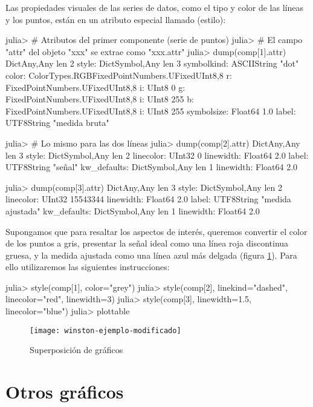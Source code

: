 Las propiedades visuales de las series de datos, como el tipo y color de las líneas y los puntos, están en un atributo especial llamado  (estilo):

\begin{jlconcode}
julia> # Atributos del primer componente (serie de puntos)
julia> # El campo "attr" del objeto "xxx" se extrae como "xxx.attr"
julia> dump(comp[1].attr)
Dict{Any,Any} len 2
  style: Dict{Symbol,Any} len 3
    symbolkind: ASCIIString "dot"
    color: ColorTypes.RGB{FixedPointNumbers.UFixed{UInt8,8}} 
      r: FixedPointNumbers.UFixed{UInt8,8} 
        i: UInt8 0
      g: FixedPointNumbers.UFixed{UInt8,8} 
        i: UInt8 255
      b: FixedPointNumbers.UFixed{UInt8,8} 
        i: UInt8 255
    symbolsize: Float64 1.0
  label: UTF8String "medida bruta"

julia> # Lo mismo para las dos líneas
julia> dump(comp[2].attr)
Dict{Any,Any} len 3
  style: Dict{Symbol,Any} len 2
    linecolor: UInt32 0
    linewidth: Float64 2.0
  label: UTF8String "señal"
  kw_defaults: Dict{Symbol,Any} len 1
    linewidth: Float64 2.0

julia> dump(comp[3].attr)
Dict{Any,Any} len 3
  style: Dict{Symbol,Any} len 2
    linecolor: UInt32 15543344
    linewidth: Float64 2.0
  label: UTF8String "medida ajustada"
  kw_defaults: Dict{Symbol,Any} len 1
    linewidth: Float64 2.0
\end{jlconcode}

Supongamos que para resaltar los aspectos de interés, queremos convertir el color de los puntos a gris, presentar la señal ideal como una línea roja discontinua gruesa, y la medida ajustada como una línea azul más delgada (figura \ref{fig:winston-ejemplo-modificado}). Para ello utilizaremos las siguientes instrucciones:

\begin{jlconcode}
julia> style(comp[1], color="grey")
julia> style(comp[2], linekind="dashed", linecolor="red", linewidth=3)
julia> style(comp[3], linewidth=1.5, linecolor="blue")
julia> plottable
\end{jlconcode}

\begin{figure}
\centering
\texttt{[image: winston-ejemplo-modificado]}
\caption{Superposición de gráficos}
\label{fig:winston-ejemplo-modificado}
\end{figure}

\section{Otros gráficos}

